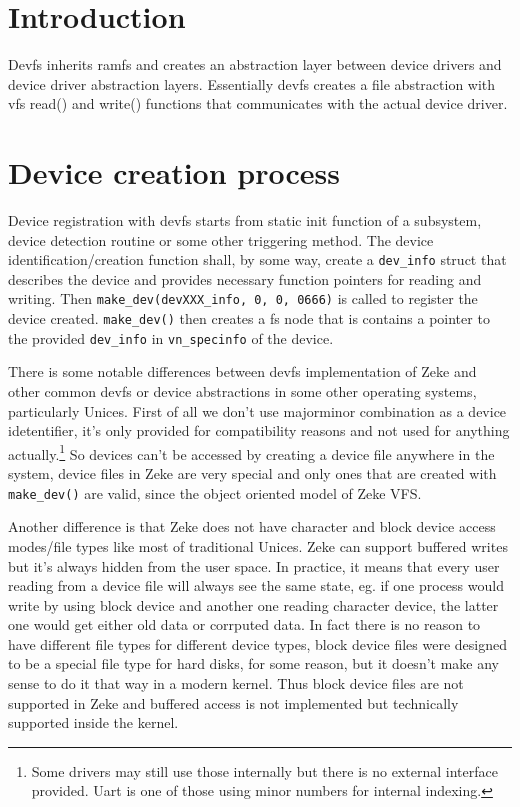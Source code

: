 \section{Introduction}

Devfs inherits ramfs and creates an abstraction layer between device drivers
and device driver abstraction layers. Essentially devfs creates a file
abstraction with vfs read() and write() functions that communicates with the
actual device driver.

\section{Device creation process}

Device registration with devfs starts from static init function of a subsystem,
device detection routine or some other triggering method. The device
identification/creation function shall, by some way, create a \verb+dev_info+
struct that describes the device and provides necessary function pointers for
reading and writing. Then \verb+make_dev(devXXX_info, 0, 0, 0666)+ is called
to register the device created. \verb+make_dev()+ then creates a fs node that is
contains a pointer to the provided \verb+dev_info+ in \verb+vn_specinfo+ of the
device.

There is some notable differences between devfs implementation of Zeke and other
common devfs or device abstractions in some other operating systems,
particularly Unices. First of all we don't use majorminor combination as a
device idetentifier, it's only provided for compatibility reasons and not used
for anything actually.\footnote{Some drivers may still use those internally but
there is no external interface provided. Uart is one of those using minor
numbers for internal indexing.} So devices can't be accessed by creating
a device file anywhere in the system, device files in Zeke are very special and
only ones that are created with \verb+make_dev()+ are valid, since the object
oriented model of Zeke VFS.

Another difference is that Zeke does not have character and block device
access modes/file types like most of traditional Unices. Zeke can support
buffered writes but it's always hidden from the user space. In practice,
it means that every user reading from a device file will always see the
same state, eg. if one process would write by using block device and another
one reading character device, the latter one would get either old data or
corrputed data. In fact there is no reason to have different file types for
different device types, block device files were designed to be a special file
type for hard disks, for some reason, but it doesn't make any sense to do it
that way in a modern kernel.\cite{Kamp:rethinkdev} Thus block device files are
not supported in Zeke and buffered access is not implemented but technically
supported inside the kernel.

